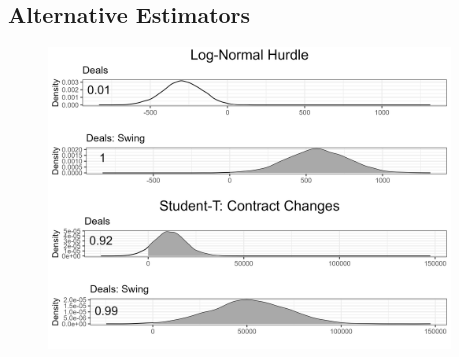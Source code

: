 \documentclass[12pt]{article}
\begin{document}
\subsection{Alternative Estimators}


\begin{figure}[htpb]
	\centering
		\includegraphics[width=0.95\textwidth]{me-deals-check.png}
	\caption{}
	\label{fig:me-deals-check}
\end{figure}



\newpage
\singlespace
 
 
\end{document}
